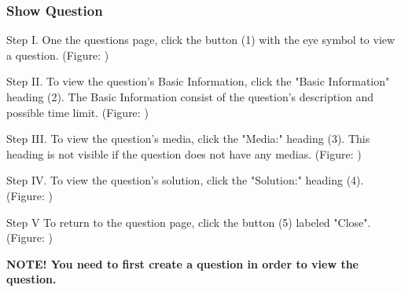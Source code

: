 \subsubsection{Show Question}

\begin{figure}[H]
	\begin{subfigure}{0.60\linewidth}
		
	\end{subfigure}
	\begin{subfigure}{0.60\linewidth}
		
	\end{subfigure}
\end{figure}

\begin{userManualItemlist}
	\item[Step I.] One the questions page, click the button (1) with the eye symbol to view a question. (Figure: )
	\item[Step II.] To view the question's Basic Information, click the "Basic Information" heading (2). The Basic Information consist of the question's description and possible time limit. (Figure: )
	\item[Step III.] To view the question's media, click the "Media:" heading (3). This heading is not visible if the question does not have any medias. (Figure: )
	\item[Step IV.] To view the question's solution, click the "Solution:" heading (4). (Figure: )
	\item[Step V] To return to the question page, click the button (5) labeled "Close". (Figure: ) 
\end{userManualItemlist}
\textbf{NOTE! You need to first create a question in order to view the question.}